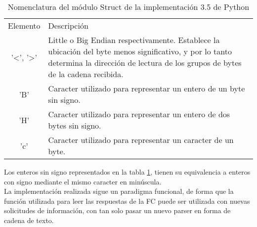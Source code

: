\begin{table}
	\begin{center}	
		\begin{tabular}{c | p{10cm}}\hline
			\toprule
			Elemento & Descripción\\
			\otoprule
			'<', '>' & Little o Big Endian respectivamente. Establece la ubicación del byte menos significativo, y por lo tanto determina la dirección de lectura de los grupos de bytes de la cadena recibida.\\
			'B' & Caracter utilizado para representar un entero de un byte sin signo.\\
			'H' & Caracter utilizado para representar un entero de dos bytes sin signo.\\
			'c' & Caracter utilizado para representar un caracter de un byte.\\
			\bottomrule
		\end{tabular}
		\caption{Nomenclatura del módulo Struct de la implementación 3.5 de Python}
		\label{tb:PY35STRUCT}
	\end{center}
\end{table} 

Los enteros sin signo representados en la tabla \ref{tb:PY35STRUCT}, tienen su equivalencia a enteros con signo mediante el mismo caracter en minúscula.\\La implementación realizada sigue un paradigma funcional, de forma que la función utilizada para leer las respuestas de la FC puede ser utilizada con nuevas solicitudes de información, con tan solo pasar un nuevo parser en forma de cadena de texto.



